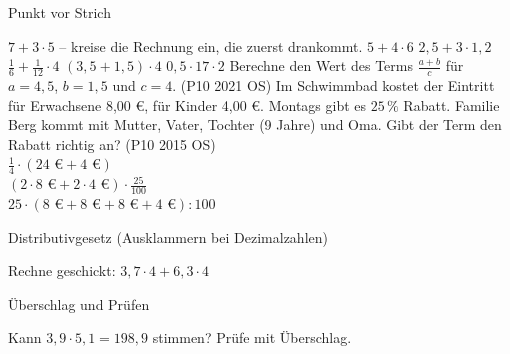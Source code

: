 \setcounter{aufgabe}{25}

\begin{aufgabe}{Punkt vor Strich}
\begin{teile}
\teil $7 + 3 \cdot 5$ – kreise die Rechnung ein, die zuerst drankommt.
\teil $5 + 4 \cdot 6$
\teil $2{,}5 + 3 \cdot 1{,}2$
\teil $\frac{1}{6} + \frac{1}{12} \cdot 4$
\teil $(3{,}5 + 1{,}5) \cdot 4$
\teil $0{,}5 \cdot 17 \cdot 2$
\teil Berechne den Wert des Terms $\frac{a + b}{c}$ für $a = 4{,}5$, $b = 1{,}5$ und $c = 4$. \hfill (P10 2021 OS)
\teil Im Schwimmbad kostet der Eintritt für Erwachsene 8,00 €, für Kinder 4,00 €. Montags gibt es $25\,\%$ Rabatt. Familie Berg kommt mit Mutter, Vater, Tochter (9 Jahre) und Oma. Gibt der Term den Rabatt richtig an? \hfill (P10 2015 OS)\\
$\frac{1}{4} \cdot (24\text{ €} + 4\text{ €})$ \janein\\
$(2 \cdot 8\text{ €} + 2 \cdot 4\text{ €}) \cdot \frac{25}{100}$ \janein\\
$25 \cdot (8\text{ €} + 8\text{ €} + 8\text{ €} + 4\text{ €}) : 100$ \janein
\end{teile}
\end{aufgabe}

\begin{aufgabe}{Distributivgesetz (Ausklammern bei Dezimalzahlen)}
\begin{teile}
\teil Rechne geschickt: $3{,}7 \cdot 4 + 6{,}3 \cdot 4$
\end{teile}
\end{aufgabe}

\begin{aufgabe}{Überschlag und Prüfen}
\begin{teile}
\teil Kann $3{,}9 \cdot 5{,}1 = 198{,}9$ stimmen? Prüfe mit Überschlag.
\end{teile}
\end{aufgabe}

